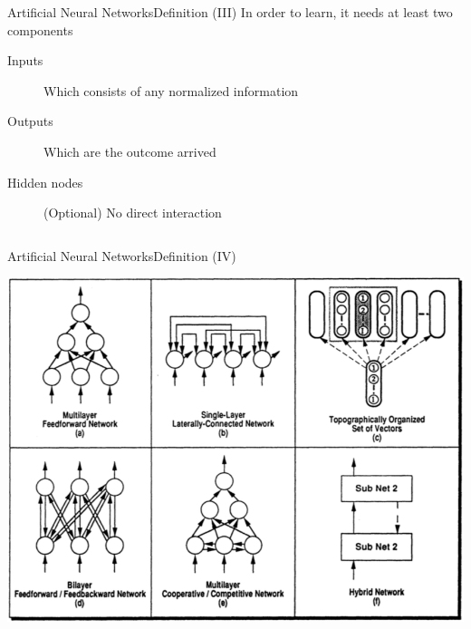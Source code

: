 \documentclass[10pt,compress]{beamer} %
\begin{document}
\begin{frame}{Artificial Neural Networks}{Definition (III)}
	In order to learn, it needs at least two components
	\begin{description}
	\item[Inputs] Which consists of any normalized information
	\item[Outputs] Which are the outcome arrived
	\item[Hidden nodes] (Optional) No direct interaction
	\end{description}

	\begin{center}
    \begin{columns}
            
    \end{columns}
	\end{center}
\end{frame}

\begin{frame}{Artificial Neural Networks}{Definition (IV)}
\begin{center}
	\centering\includegraphics[width=0.8\linewidth]{figs/arquitecturas.png}
\end{center}
\end{frame}
\end{document}
